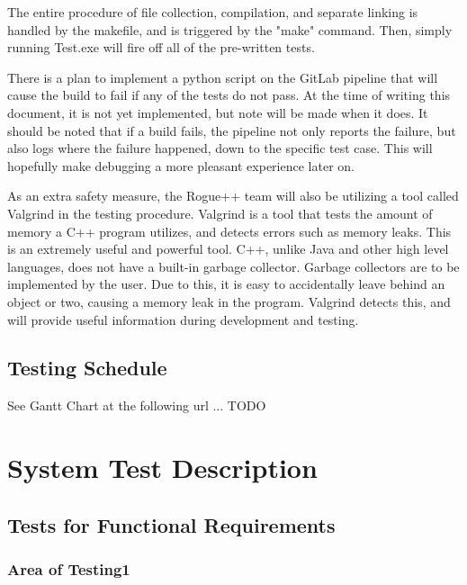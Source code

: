 \documentclass[12pt, titlepage]{article}
\begin{document}
	\bigskip

	The entire procedure of file collection, compilation, and separate linking is handled by the makefile, and is triggered by the "make" command. Then, simply running Test.exe will fire off all of the pre-written tests.

	\bigskip

	There is a plan to implement a python script on the GitLab pipeline that will cause the build to fail if any of the tests do not pass. At the time of writing this document, it is not yet implemented, but note will be made when it does. It should be noted that if a build fails, the pipeline not only reports the failure, but also logs where the failure happened, down to the specific test case. This will hopefully make debugging a more pleasant experience later on.

	\bigskip

	As an extra safety measure, the Rogue++ team will also be utilizing a tool called Valgrind in the testing procedure. Valgrind is a tool that tests the amount of memory a C++ program utilizes, and detects errors such as memory leaks. This is an extremely useful and powerful tool. C++, unlike Java and other high level languages, does not have a built-in garbage collector. Garbage collectors are to be implemented by the user. Due to this, it is easy to accidentally leave behind an object or two, causing a memory leak in the program. Valgrind detects this, and will provide useful information during development and testing.

	\subsection{Testing Schedule}
		
	See Gantt Chart at the following url ... TODO

\newpage
\section{System Test Description}
\label{section3}
	
	\subsection{Tests for Functional Requirements}

		\subsubsection{Area of Testing1}
		
\end{document}
